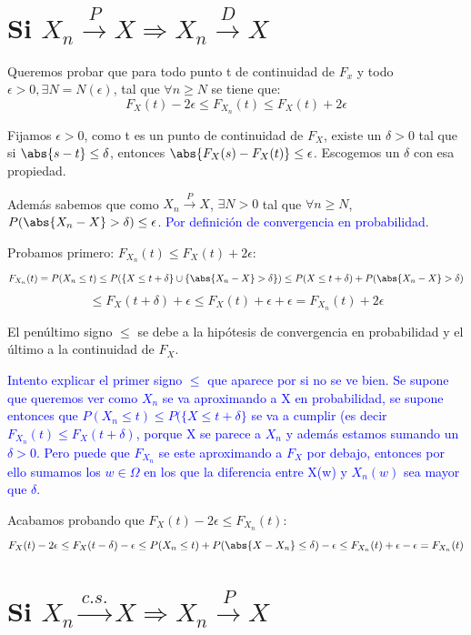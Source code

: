 \documentclass{apuntes}
\begin{document}
\section{Si $X_n \stackrel{P}{\rightarrow} X  \Rightarrow X_n \stackrel{D}{\rightarrow} X$}
Queremos probar que para todo punto t de continuidad de $F_x$ y todo $\epsilon >0, \exists N=N(\epsilon)$, tal que $\forall n \geq N$ se tiene que:
\[
F_X(t)-2\epsilon \leq F_{X_n}(t) \leq F_X(t)+2\epsilon
\]

Fijamos $\epsilon>0$, como t es un punto de continuidad de $F_X$, existe un $\delta>0$ tal que si $\abs{s-t}\leq \delta$, entonces $\abs{F_X(s)-F_X(t)} \leq \epsilon$. Escogemos un $\delta$ con esa propiedad.

Además sabemos que como $X_n \stackrel{P}{\rightarrow} X$, $\exists N>0$ tal que $\forall n \geq N$, $P(\abs{X_n -X}>\delta)\leq \epsilon$. \textcolor{blue}{Por definición de convergencia en probabilidad}.

Probamos primero: $F_{X_n}(t) \leq F_X(t)+2\epsilon$:
\[
F_{X_n}(t) = P(X_n \leq t) \leq P(\{X \leq t+\delta\} \cup \{\abs{X_n -X} > \delta\}) \leq P(X \leq t+\delta)+ P(\abs{X_n -X} > \delta)
\]
\[
\leq F_X(t+\delta)+\epsilon \leq F_X(t)+\epsilon+\epsilon = F_{X_n}(t) + 2\epsilon
\]

El penúltimo signo $\leq$ se debe a la hipótesis de convergencia en probabilidad y el último a la continuidad de $F_X$.

\textcolor{blue}{Intento explicar el primer signo $\leq$ que aparece por si no se ve bien. Se supone que queremos ver como $X_n$ se va aproximando a X en probabilidad, se supone entonces que $P(X_n \leq t) \leq P(\{X \leq t+\delta\}$ se va a cumplir (es decir $F_{X_n}(t) \leq F_X(t+\delta)$, porque X se parece a $X_n$ y además estamos sumando un $\delta >0$. Pero puede que $F_{X_n}$ se este aproximando a $F_X$ por debajo, entonces por ello sumamos los $w \in \Omega$ en los que la diferencia entre X(w) y $X_n(w)$ sea mayor que $\delta$.}

Acabamos probando que $F_X(t)-2\epsilon \leq F_{X_n}(t)$:
\[
F_X(t)-2\epsilon \leq F_X(t-\delta)-\epsilon \leq P(X_n \leq t)+ P(\abs{X -X_n} \leq \delta) - \epsilon \leq F_{X_n}(t) + \epsilon - \epsilon  = F_{X_n}(t)
\]

\section{Si $X_n \stackrel{c.s.}{\rightarrow} X  \Rightarrow X_n \stackrel{P}{\rightarrow} X$}
\end{document}
